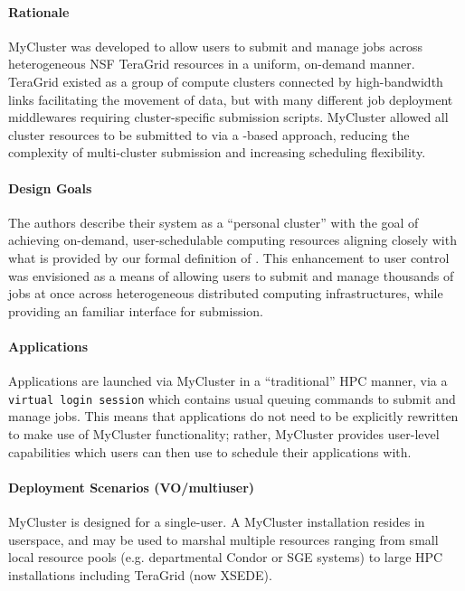 \documentclass{sig-alternate}
\begin{document}
\paragraph{Rationale}
MyCluster was developed to allow users to submit and manage
jobs across heterogeneous NSF TeraGrid resources in a uniform,
on-demand manner.  TeraGrid existed as a group of compute clusters
connected by high-bandwidth links facilitating the movement
of data, but with many different job deployment middlewares
requiring cluster-specific submission scripts.  MyCluster
allowed all cluster resources to be submitted to via a
\pilotjob-based approach, reducing the complexity of
multi-cluster submission and increasing scheduling flexibility.

\paragraph{Design Goals}
The authors describe their system
as a ``personal cluster'' with the goal of achieving on-demand,
user-schedulable computing resources aligning closely with what is
provided by our formal definition of \pilotjobs.  This enhancement
to user control was envisioned as a means of allowing
users to submit and manage thousands of jobs at once
across heterogeneous distributed computing infrastructures, while
providing an familiar interface for submission.

\paragraph{Applications}
Applications are launched via MyCluster in a ``traditional''
HPC manner, via a \texttt{virtual
login session} which contains usual queuing commands to submit
and manage jobs.  This means that applications do not need
to be explicitly rewritten to make use of MyCluster functionality;
rather, MyCluster provides user-level \pilotjob capabilities
which users can then use to schedule their applications with.

\paragraph{Deployment Scenarios (VO/multiuser)}
MyCluster is designed for a single-user.  A MyCluster
installation resides in userspace, and may be used
to marshal multiple resources ranging from small local resource pools
(e.g. departmental Condor or SGE systems) to large HPC installations
including TeraGrid (now XSEDE).
\end{document}
